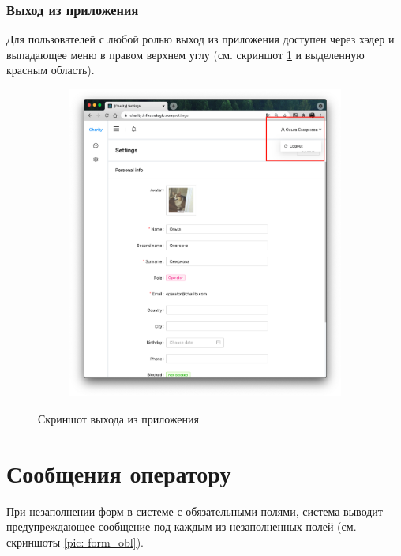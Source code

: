 \documentclass[a4paper,12pt,reqno]{article}
\begin{document}
	\subsubsection{Выход из приложения}
	
	Для пользователей с любой ролью выход из приложения доступен через хэдер и выпадающее меню в правом верхнем углу (см. скриншот \ref{pic: logout} и выделенную красным область).
	
	
	\begin{figure}[H]
	    \centering
		\begin{subfigure}[b]{0.475\linewidth}
			\includegraphics[width=\linewidth]{img/ro/logout.png}
		\end{subfigure}
		\caption{Скриншот выхода из приложения}
		\label{pic: logout}
	\end{figure}
	
	\section{Сообщения оператору}
	
	При незаполнении форм в системе с обязательными полями, система выводит предупреждающее сообщение под каждым из незаполненных полей (см. скриншоты \ref{pic: form_obl}).
	
\end{document}
